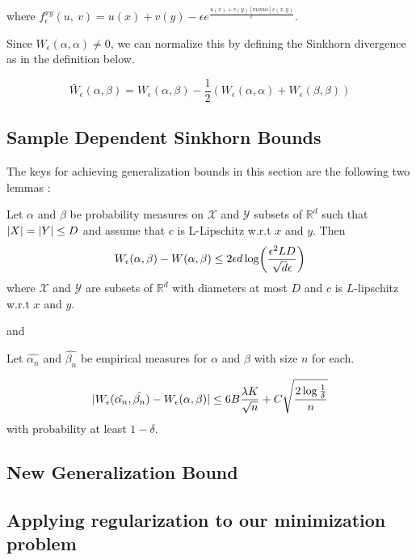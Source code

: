 where $f_{\epsilon}^{xy}(u,\ v)=u(x)+v(y)- \epsilon e^{\frac{u(x)+v(y)[minus]\mathrm{c}(x,y)}{\epsilon}}.$

Since $W_{\epsilon}(\alpha,\alpha)\neq 0$, we can normalize this by defining the Sinkhorn divergence as in the definition below.
\begin{definition}
\[
\bar{W}_{\epsilon}(\alpha,\beta)=W_{\epsilon}(\alpha,\beta)-\frac{1}{2}(W_{\epsilon}(\alpha,\alpha)+W_{\epsilon}(\beta,\beta))
\] 
\end{definition}

\subsection{Sample Dependent Sinkhorn Bounds}

The keys for achieving generalization bounds in this section are the following two lemmas \cite{Genevay2018}: 
\begin{lemma}
	\label{divergence_sinkhorn_from_wasserstein}
	Let $\alpha$ and $\beta$ be probability measures on $\mathcal{X}$ and $\mathcal{Y}$ subsets of $\mathbb{R}^d$ such that $\lvert X\rvert=\lvert Y\rvert\leq D$ and assume that $c$ is L-Lipschitz w.r.t $x$ and $y$. Then
	$$W_{\epsilon}(\alpha,\beta)-W(\alpha,\beta) \leq 2\epsilon d \log \paren*{\frac{\epsilon^2 L D}{\sqrt{d}\epsilon}}$$ where $\mathcal{X}$ and $\mathcal{Y}$ are subsets of $\mathbb{R}^d$ with diameters at most $D$ and $c$ is $L$-lipschitz w.r.t $x$ and $y$.
\end{lemma}

and

\begin{lemma}
	Let $\hat{\alpha_n}$ and $\hat{\beta_n}$ be empirical measures for $\alpha$ and $\beta$ with size $n$ for each.
	
	\[
	\lvert W_{\epsilon}(\hat{\alpha_n},\hat{\beta_n})-W_{\epsilon}(\alpha,\beta)\rvert \leq 6B \frac{\lambda K}{\sqrt{n}} + C\sqrt{\frac{2 \log\frac{1}{\delta}}{n}}
	\] with probability at least $1-\delta$.
\end{lemma}

\subsection*{New Generalization Bound}

\subsection*{Applying regularization to our minimization problem}

